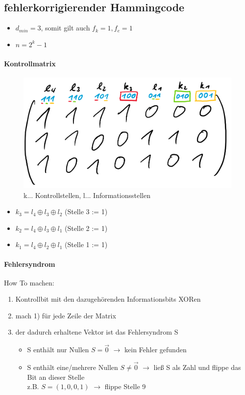 \documentclass[12pt,a4paper]{article}
\begin{document}
\subsection{fehlerkorrigierender Hammingcode}
\begin{itemize}
\item $d_{min} =  3$, somit gilt auch $f_k = 1, f_e = 1$
\item $n = 2^k -1$
\end{itemize}


\paragraph{Kontrollmatrix}
\begin{figure}[H]
\centering
\includegraphics[scale=0.3]{./resources/hamming_control.png}
\caption{k... Kontrollstellen, l... Informationsstellen}
\end{figure}
\begin{itemize}
\item $k_3 = l_4 \oplus l_3 \oplus l_2$ (Stelle 3 := 1)
\item $k_2 = l_4 \oplus l_3 \oplus l_1$ (Stelle 2 := 1)
\item $k_1 = l_4 \oplus l_2 \oplus l_1$ (Stelle 1 := 1)
\end{itemize}

\paragraph{Fehlersyndrom}
How To machen:
\begin{enumerate}
\item Kontrollbit mit den dazugehörenden Informationsbits XORen
\item mach 1) für jede Zeile der Matrix
\item der dadurch erhaltene Vektor ist das Fehlersyndrom S
\begin{itemize}
\item S enthält nur Nullen $S = \vec{0}$ $\rightarrow$ kein Fehler gefunden
\item S enthält eine/mehrere Nullen $S \neq \vec{0}$ $\rightarrow$ ließ S als Zahl und flippe das Bit an dieser Stelle\\
z.B. $S = (1,0,0,1)$ $\rightarrow$ flippe Stelle 9
\end{itemize}
\end{enumerate}
\end{document}
